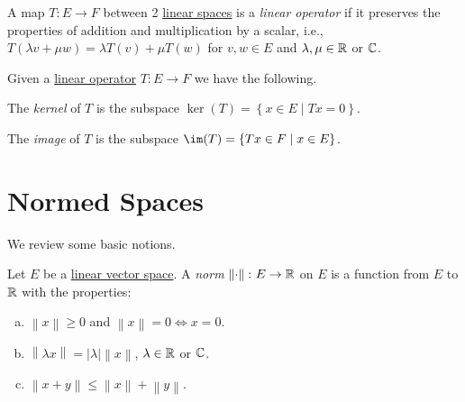 \begin{definition}\label{def:linear-operator}
	A map \(T\colon E\to F\) between 2 \hyperref[def:linear-vector-space]{linear spaces} is a \emph{linear operator} if it preserves the properties of addition and multiplication by a scalar, i.e., \(T(\lambda v + \mu w) = \lambda T(v) + \mu T(w)\) for \(v, w\in E\) and \(\lambda , \mu \in \mathbb{\MakeUppercase{r}}\) or \(\mathbb{\MakeUppercase{c}}\).
\end{definition}

\begin{definition*}
	Given a \hyperref[def:linear-operator]{linear operator} \(T\colon E \to F\) we have the following.
	\begin{definition}[Kernel]
		The \emph{kernel} of \(T\) is the subspace \(\ker(T) = \left\{ x\in E\mid Tx=0 \right\} \).
	\end{definition}

	\begin{definition}[Image]
		The \emph{image} of \(T\) is the subspace \(\im(T) = \left\{ Tx\in F\mid x\in E \right\} \).
	\end{definition}
\end{definition*}

\section{Normed Spaces}
We review some basic notions.

\begin{definition}[Norm]\label{def:norm}
	Let \(E\) be a \hyperref[def:linear-vector-space]{linear vector space}. A \emph{norm} \(\left\lVert \cdot \right\rVert \colon E \to \mathbb{\MakeUppercase{r}} \) on \(E\) is a function from \(E\) to \(\mathbb{\MakeUppercase{r}} \) with the properties:
	\begin{enumerate}[(a)]
		\item \(\left\lVert x\right\rVert \geq 0\) and \(\left\lVert x\right\rVert =0 \iff x=0\).
		\item \(\left\lVert \lambda x\right\rVert = \left\vert \lambda  \right\vert \left\lVert x\right\rVert\), \(\lambda \in\mathbb{\MakeUppercase{r}} \) or \(\mathbb{\MakeUppercase{c}} \).
		\item \(\left\lVert x+y\right\rVert \leq \left\lVert x\right\rVert + \left\lVert y\right\rVert \).
	\end{enumerate}
\end{definition}

